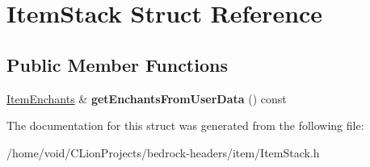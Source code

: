 \hypertarget{struct_item_stack}{}\section{Item\+Stack Struct Reference}
\label{struct_item_stack}
\subsection*{Public Member Functions}
\begin{DoxyCompactItemize}
\item 
\mbox{\label{struct_item_stack_a7b3773dfc44d4108886bbca7558b2810}} 
\mbox{\hyperlink{struct_item_enchants}{Item\+Enchants}} \& {\bfseries get\+Enchants\+From\+User\+Data} () const
\end{DoxyCompactItemize}


The documentation for this struct was generated from the following file\+:\begin{DoxyCompactItemize}
\item 
/home/void/\+C\+Lion\+Projects/bedrock-\/headers/item/Item\+Stack.\+h\end{DoxyCompactItemize}
